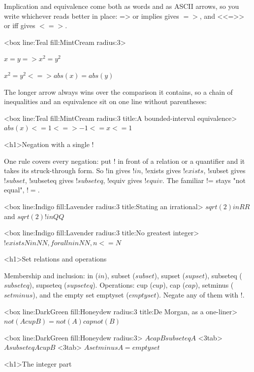 \documentclass[
  margins=18,
  font=Latin Modern Roman,
  size=12,
  linespread=1.4,
  lang=en
]{scholatex}
\begin{document}
Implication and equivalence come both as words and as ASCII arrows, so you
write whichever reads better in place: => or implies gives $=>$,
and <<=>> or iff gives $<=>$.

<box line:Teal fill:MintCream radius:3>{
	$x = y => x^2 = y^2$

	$x^2 = y^2 <=> abs(x) = abs(y)$
}

The longer arrow always wins over the comparison it contains, so a chain of
inequalities and an equivalence sit on one line without parentheses:

<box line:Teal fill:MintCream radius:3 title:{A bounded-interval equivalence}>{
	$abs(x) <= 1 <=> -1 <= x <= 1$
}

<h1>Negation with a single !

One rule covers every negation: put ! in front of a relation or a
quantifier and it takes its struck-through form. So !in gives $!in$,
!exists gives $!exists$, !subset gives $!subset$, !subseteq
gives $!subseteq$, !equiv gives $!equiv$. The familiar != stays
"not equal", $!=$.

<box line:Indigo fill:Lavender radius:3 title:{Stating an irrational}>{
	$sqrt(2) in RR$ and $sqrt(2) !in QQ$
}

<box line:Indigo fill:Lavender radius:3 title:{No greatest integer}>{
	$!exists N in NN, forall n in NN, n <= N$
}

<h1>Set relations and operations

Membership and inclusion: in ($in$), subset ($subset$), supset
($supset$), subseteq ($subseteq$), supseteq ($supseteq$). Operations:
cup ($cup$), cap ($cap$), setminus ($setminus$), and the empty set
emptyset ($emptyset$). Negate any of them with !.

<box line:DarkGreen fill:Honeydew radius:3 title:{De Morgan, as a one-liner}>{
	$not(A cup B) = not(A) cap not(B)$
}

<box line:DarkGreen fill:Honeydew radius:3>{
	$A cap B subseteq A$ <3tab> $A subseteq A cup B$ <3tab> $A setminus A = emptyset$
}

<h1>The integer part
\end{document}
